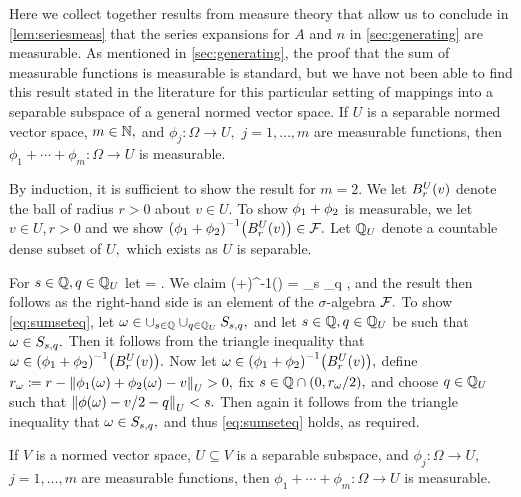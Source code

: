 Here we collect together results from measure theory that allow us to conclude in \cref{lem:seriesmeas} that the series expansions for $A$ and $n$ in \cref{sec:generating} are measurable. As mentioned in \cref{sec:generating}, the proof that the sum of measurable functions is measurable is standard, but we have not been able to find this result stated in the literature for this particular setting of mappings into a separable subspace of a general normed vector space.
\ble\label{lem:sepsum}
If $U$ is a separable normed vector space, $m \in \mathbb N,$ and $\phi_j:\Omega\rightarrow U,$ $j=1,\ldots,m$  are measurable functions, then $\phi_1+\cdots+\phi_m : \Omega\rightarrow U$ is measurable.
\ele

By induction, it is sufficient to show the result for $m=2.$ We let $\Ballspace{U}{r}{v}$ denote the ball of radius $r>0$ about $v \in U$. To show $\phi_{1}+\phi_{2}$ is measurable, we let $v \in U, r>0$ and we show $\mleft(\phio+\phit\mright)^{-1}\mleft(\Ballspace{U}{r}{v}\mright) \in \cF.$ Let $\mathbb Q_{U}$ denote a countable dense subset of $U,$ which exists as $U$ is separable.

For $s \in \mathbb Q, q \in \mathbb Q_{U}$ let
\beqs
\setsq =  \cap {}.
\eeqs
We claim
\beq\label{eq:sumseteq}
\mleft(\phio+\phit\mright)^{-1}\mleft(\mright) = \bigcup_{s \in \QQFF} \bigcup_{q \in \QQU} \setsq,
\eeq
and the result then follows as the right-hand side is an element of the $\sigma$-algebra $\mathcal F.$ To show \eqref{eq:sumseteq}, let $\omega \in \cup_{s \in \mathbb Q}\cup_{q \in \mathbb Q_{U}} S_{s,q},$ and let $s \in \mathbb Q, q \in \mathbb Q_{U}$ be such that $\omega \in S_{s,q}.$ Then it follows from the triangle inequality that $\omega \in \mleft(\phio+\phit\mright)^{-1}\mleft(\Ballspace{U}{r}{v}\mright).$
Now let $\omega \in \mleft(\phio+\phit\mright)^{-1}\mleft(\Ballspace{U}{r}{v}\mright),$ define $\dw \de r - \NU{\phio(\omega)+\phit(\omega)-v} > 0,$ fix $s \in \mathbb Q \cap (0,r_{\omega}/2),$ and choose $q \in \mathbb Q_{U}$ such that $\NU{\phi(\omega) - v/2 -q} < s.$ Then again it follows from the triangle inequality that $\omega \in S_{s,q},$ and thus \eqref{eq:sumseteq} holds, as required.
\epf

\bco\label{cor:sepsubsum}
If $V$ is a normed vector space, $U \subseteq V$ is a separable subspace, and $\phi_j:\Omega\rightarrow U,$  $j=1,\ldots,m$  are measurable functions, then $\phi_1+\cdots+\phi_m : \Omega\rightarrow U$ is measurable.
\eco

